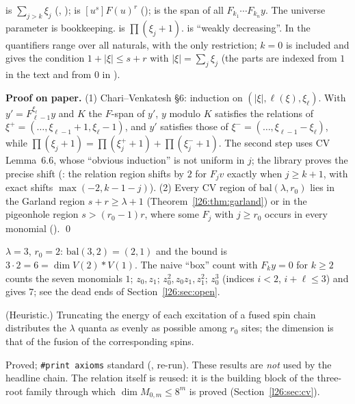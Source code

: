 \begin{dictionary}
 is $\sum_{j>k}\xi_j$ (, );  is
$[u^s]F(u)^r$ ();  is the span of all $F_{k_1}\cdots F_{k_n}y$. The
universe parameter  is bookkeeping.  is $\prod(\xi_j+1)$. 
is ``weakly decreasing''. In  the quantifiers  range over all naturals, with  the only
restriction; $k=0$ is included and gives the condition $1+|\xi|\le s+r$ with $|\xi|=\sum_j\xi_j$ (the parts are indexed from
$1$ in the text and from $0$ in ).
\end{dictionary}

\textbf{Proof on paper.} (1) Chari--Venkatesh \S6: induction on $(|\xi|,\ell(\xi),\xi_\ell)$. With
$y'=F_{\ell-1}^{\xi_\ell}y$ and $K$ the $F$-span of $y'$, $y$ modulo $K$ satisfies the relations of
$\xi^+=(\dots,\xi_{\ell-1}+1,\xi_\ell-1)$, and $y'$ satisfies those of $\xi^-=(\dots,\xi_{\ell-1}-\xi_\ell)$, while
$\prod(\xi_j+1)=\prod(\xi^+_j+1)+\prod(\xi^-_j+1)$. The second step uses CV Lemma~6.6, whose ``obvious induction'' is not
uniform in $j$; the library proves the precise shift (: the relation region shifts by $2$ for
$F_jv$ exactly when $j\ge k+1$, with exact shifts $\max(-2,k-1-j)$). (2) Every CV region of $\mathrm{bal}(\lambda,r_0)$ lies in
the Garland region $s+r\ge\lambda+1$ (Theorem~\ref{l26:thm:garland}) or in the pigeonhole region $s>(r_0-1)r$, where some
$F_j$ with $j\ge r_0$ occurs in every monomial (). \qed

\begin{example}
$\lambda=3$, $r_0=2$: $\mathrm{bal}(3,2)=(2,1)$ and the bound is $3\cdot2=6=\dim V(2)*V(1)$. The naive ``box''
count with $F_ky=0$ for $k\ge2$ counts the seven monomials $1$; $z_0,z_1$; $z_0^2,z_0z_1,z_1^2$; $z_0^3$ (indices $i<2$,
$i+\ell\le3$) and gives $7$; see the dead ends of Section~\ref{l26:sec:open}.
\end{example}

\begin{physics}
(Heuristic.) Truncating the energy of each excitation of a fused spin chain distributes the $\lambda$ quanta as evenly as possible among
$r_0$ sites; the dimension is that of the fusion of the corresponding spins.
\end{physics}

\begin{status}
Proved; \texttt{\#print axioms} standard (,  re-run). These results are \emph{not} used by
the headline chain. The relation  itself is reused: it is the building block of the three-root family through
which $\dim M_{0,m}\le8^m$ is proved (Section~\ref{l26:sec:cv}).
\end{status}

